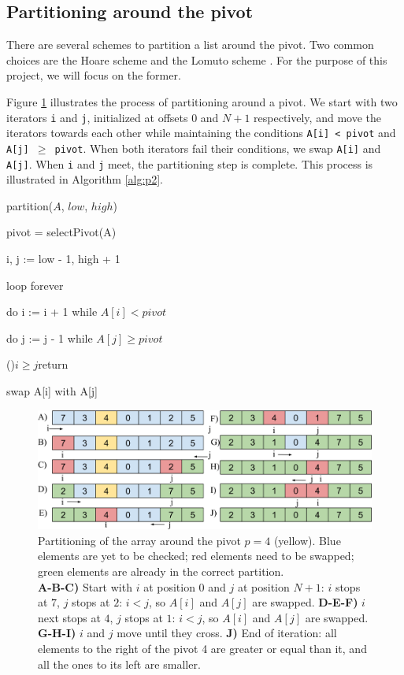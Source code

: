 \documentclass[]{finalproject}
\begin{document}
\subsection{Partitioning around the pivot}
There are several schemes to partition a list around the pivot. Two common choices are the Hoare scheme and the Lomuto scheme \cite{qs-scheme}. For the purpose of this project, we will focus on the former.

Figure \ref{fig:rec-part2} illustrates the process of partitioning around a pivot. We start with two iterators \texttt{i} and \texttt{j}, initialized at offsets $0$ and $N+1$ respectively, and move the iterators towards each other while maintaining the conditions \texttt{A[i] < pivot} and \texttt{A[j] $\geq$ pivot}. When both iterators fail their conditions, we swap \texttt{A[i]} and \texttt{A[j]}. When \texttt{i} and \texttt{j} meet, the partitioning step is complete. This process is illustrated in Algorithm \ref{alg:p2}.

\begin{algorithm}
\caption{partition($A$, $low$, $high$)}
\label{alg:p2}

pivot = selectPivot(A)

i, j := low - 1, high + 1

loop forever

\Indp

do i := i + 1 while $A[i] < pivot$

do j := j - 1 while $A[j] \geq pivot$

\If(){$i \geq j$}{return}

swap A[i] with A[j]
\end{algorithm}

\begin{figure}[H]
\begin{center}
\includegraphics[scale=0.4]{img/pivot_partitioning.png}
\end{center}
\caption{Partitioning of the array around the pivot $p=4$ (yellow).
Blue elements are yet to be checked; red elements need to be swapped; green elements are already in the correct partition.\\
\textbf{A-B-C)} Start with $i$ at position $0$ and $j$ at position $N+1$: $i$ stops at $7$, $j$ stops at $2$: $i<j$, so $A[i]$ and $A[j]$ are swapped.
\textbf{D-E-F)} $i$ next stops at $4$, $j$ stops at $1$: $i<j$, so $A[i]$ and $A[j]$ are swapped.
\textbf{G-H-I)} $i$ and $j$ move until they cross.
\textbf{J)} End of iteration: all elements to the right of the pivot 4 are greater or equal than it, and all the ones to its left are smaller.}
\label{fig:rec-part2}
\end{figure}
\end{document}
